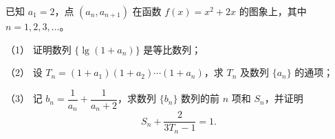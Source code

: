 \begin{question}
已知 $a_1=2$，点 $(a_n,a_{n+1})$ 在函数 $f(x)=x^2+2x$ 的图象上，其中 $n=1,2,3,\ldots$。

（1） 证明数列 $\{\lg(1+a_n)\}$ 是等比数列；

（2） 设 $T_n=(1+a_1)(1+a_2)\cdots(1+a_n)$，求 $T_n$ 及数列 $\{a_n\}$ 的通项；

（3） 记 $b_n=\dfrac1{a_n}+\dfrac1{a_n+2}$，求数列 $\{b_n\}$ 数列的前 $n$ 项和 $S_n$，并证明
\nopagebreak[4]
\[
S_n+\dfrac{2}{3T_n-1}=1.
\]

\end{question}